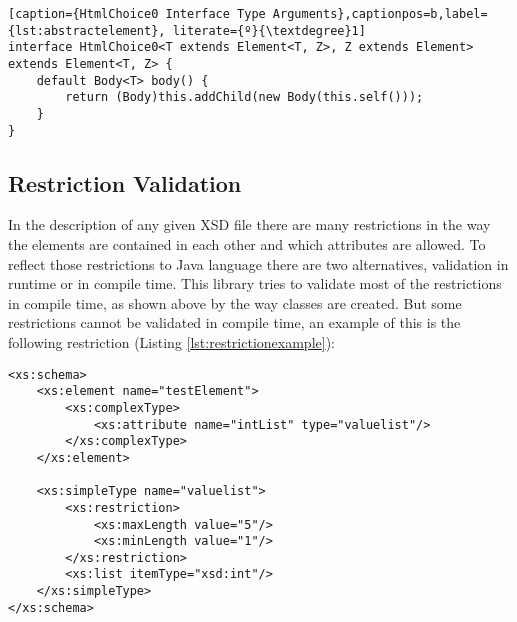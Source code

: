 \bigskip


\begin{minipage}{\linewidth}
\begin{lstlisting}[caption={HtmlChoice0 Interface Type Arguments},captionpos=b,label={lst:abstractelement}, literate={º}{\textdegree}1]
interface HtmlChoice0<T extends Element<T, Z>, Z extends Element> 		                                           extends Element<T, Z> {
    default Body<T> body() {
        return (Body)this.addChild(new Body(this.self()));
    }
}
\end{lstlisting}
\end{minipage}

\subsection{Restriction Validation}
\label{sec:restrictionvalidation}

In the description of any given \ac{XSD} file there are many restrictions in the way the elements are contained in each other and which attributes are allowed. To reflect those restrictions to Java language there are two alternatives, validation in runtime or in compile time. This library tries to validate most of the restrictions in compile time, as shown above by the way classes are created. But some restrictions cannot be validated in compile time, an example of this is the following restriction (Listing \ref{lst:restrictionexample}):

\bigskip


\begin{minipage}{\linewidth}
\begin{lstlisting}[caption={Restrictions Example XSD},captionpos=b,label={lst:restrictionexample}]
<xs:schema>
    <xs:element name="testElement">
        <xs:complexType>
            <xs:attribute name="intList" type="valuelist"/>
        </xs:complexType>
    </xs:element>
    
    <xs:simpleType name="valuelist">
        <xs:restriction>
            <xs:maxLength value="5"/>
            <xs:minLength value="1"/>
        </xs:restriction>
        <xs:list itemType="xsd:int"/>
    </xs:simpleType>
</xs:schema>
\end{lstlisting}
\end{minipage}

